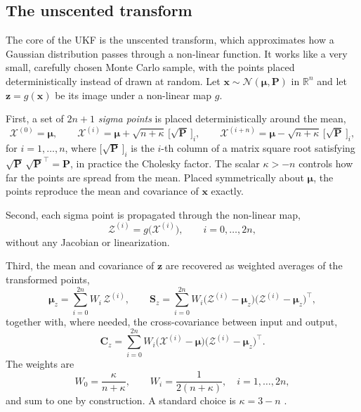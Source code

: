 \subsection{The unscented transform}
The core of the UKF is the unscented transform, which approximates how a Gaussian distribution passes through a non-linear function. It works like a very small, carefully chosen Monte Carlo sample, with the points placed deterministically instead of drawn at random. Let $\mathbf{x} \sim \mathcal{N}(\boldsymbol{\mu}, \mathbf{P})$ in $\mathbb{R}^{n}$ and let $\mathbf{z} = g(\mathbf{x})$ be its image under a non-linear map $g$.

First, a set of $2n+1$ \emph{sigma points} is placed deterministically around the mean,
\begin{equation}\label{eq:sigma points}
    \mathcal{X}^{(0)} = \boldsymbol{\mu}, \qquad
    \mathcal{X}^{(i)} = \boldsymbol{\mu} + \sqrt{n+\kappa}\,\bigl[\sqrt{\mathbf{P}}\,\bigr]_i, \qquad
    \mathcal{X}^{(i+n)} = \boldsymbol{\mu} - \sqrt{n+\kappa}\,\bigl[\sqrt{\mathbf{P}}\,\bigr]_i,
\end{equation}
for $i = 1, \dots, n$, where $\bigl[\sqrt{\mathbf{P}}\,\bigr]_i$ is the $i$-th column of a matrix square root satisfying $\sqrt{\mathbf{P}}\,\sqrt{\mathbf{P}}^{\top} = \mathbf{P}$, in practice the Cholesky factor. The scalar $\kappa > -n$ controls how far the points are spread from the mean. Placed symmetrically about $\boldsymbol{\mu}$, the points reproduce the mean and covariance of $\mathbf{x}$ exactly.

Second, each sigma point is propagated through the non-linear map,
\begin{equation}\label{eq:sigma propagate}
    \mathcal{Z}^{(i)} = g\bigl(\mathcal{X}^{(i)}\bigr), \qquad i = 0, \dots, 2n,
\end{equation}
without any Jacobian or linearization.

Third, the mean and covariance of $\mathbf{z}$ are recovered as weighted averages of the transformed points,
\begin{equation}\label{eq:ut recover}
    \boldsymbol{\mu}_{z} = \sum_{i=0}^{2n} W_i\, \mathcal{Z}^{(i)}, \qquad
    \mathbf{S}_{z} = \sum_{i=0}^{2n} W_i \bigl(\mathcal{Z}^{(i)} - \boldsymbol{\mu}_{z}\bigr)\bigl(\mathcal{Z}^{(i)} - \boldsymbol{\mu}_{z}\bigr)^{\top},
\end{equation}
together with, where needed, the cross-covariance between input and output,
\begin{equation}\label{eq:ut cross}
    \mathbf{C}_{z} = \sum_{i=0}^{2n} W_i \bigl(\mathcal{X}^{(i)} - \boldsymbol{\mu}\bigr)\bigl(\mathcal{Z}^{(i)} - \boldsymbol{\mu}_{z}\bigr)^{\top}.
\end{equation}
The weights are
\begin{equation}\label{eq:ut weights}
    W_0 = \frac{\kappa}{n+\kappa}, \qquad
    W_i = \frac{1}{2(n+\kappa)}, \quad i = 1, \dots, 2n,
\end{equation}
and sum to one by construction. A standard choice is $\kappa = 3 - n$ \cite[Ch.~5]{sarkka:bayesian_filtering}.

